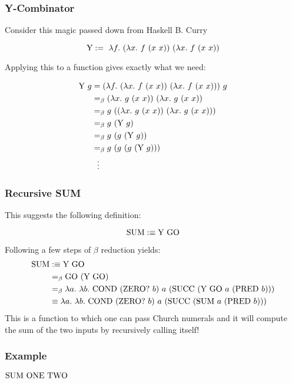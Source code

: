 \documentclass{beamer}
\begin{document}
\begin{frame}
	\frametitle{Y-Combinator}

	Consider this magic passed down from Haskell B. Curry

	$$\text{Y}:= \ \lambda f. \ (\lambda x. \ f \ (x \ x)) \ (\lambda x. \ f \ (x \ x))$$

	Applying this to a function gives exactly what we need:

	\begin{align*}
		\YCOMB \ g &= (\lambda f. \ (\lambda x. \ f \ (x \ x)) \ (\lambda x. \ f \ (x \ x))) \ g \\
		&\beq (\lambda x. \ g \ (x \ x)) \ (\lambda x. \ g \ (x \ x)) \\
		&\beq g \ ((\lambda x. \ g \ (x \ x)) \ (\lambda x. \ g \ (x \ x))) \\
		&\beq g \ (\YCOMB \ g)\\
		&\beq g \ (g \ (\YCOMB \ g))\\
		&\beq g \ (g \ (g \ (\YCOMB \ g)))\\
		&\ \ \vdots
	\end{align*}

\end{frame}

\begin{frame}
	\frametitle{Recursive SUM}

	This suggests the following definition:

	$$\text{SUM} :\equiv \text{Y} \ \text{GO}$$

	Following a few steps of $\beta$ reduction yields:
	\begin{align*}
		\SUM &:\equiv \YCOMB \ \GO \\
		&\beq \GO \ (\YCOMB \ \GO) \\
		&\beq \lambda a. \ \lambda b. \ \COND \ (\ISITZERO \ b) \ a \ (\SUCC \ (\YCOMB \ \GO \ a \ (\PRED \ b))) \\
		&\equiv \lambda a. \ \lambda b. \ \COND \ (\ISITZERO \ b) \ a \ (\SUCC \ (\SUM \ a \ (\PRED \ b)))
	\end{align*}
	This is a function to which one can pass Church numerals and it will compute the sum of the two inputs by recursively calling itself!

\end{frame}

\begin{frame}
	\frametitle{Example}
	
	$\text{SUM} \ \text{ONE} \ \text{TWO}$

	\vspace{6cm}

\end{frame}
\end{document}
